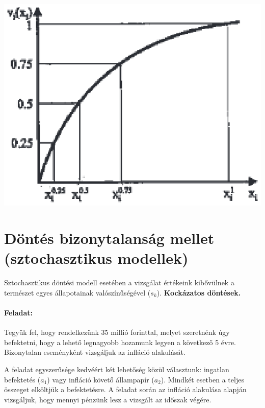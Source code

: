 \documentclass[a4paper,12pt]{article}
\begin{document}
\begin{center}

\includegraphics[scale=0.7]{valuesample}
\\
\end{center}


\section{Döntés bizonytalanság mellet (sztochasztikus modellek)}

Sztochasztikus döntési modell esetében a vizsgálat értékeink kibővülnek a természet egyes állapotainak valószínűségével ($s_k$). \textbf{Kockázatos döntések.}

\paragraph{Feladat:} Tegyük fel, hogy rendelkezünk 35 millió forinttal, melyet szeretnénk úgy befektetni, hogy a lehető legnagyobb hozamunk legyen a következő 5 évre. Bizonytalan eseményként vizsgáljuk az infláció alakulását.

A feladat egyszerűsége kedvéért két lehetőség közül választunk: ingatlan befektetés ($a_1$) vagy infláció követő állampapír ($a_2$). Mindkét esetben a teljes összeget elköltjük a befektetésre. A feladat során az infláció alakulása alapján vizsgáljuk, hogy mennyi pénzünk lesz a vizsgált az időszak végére.
\end{document}
